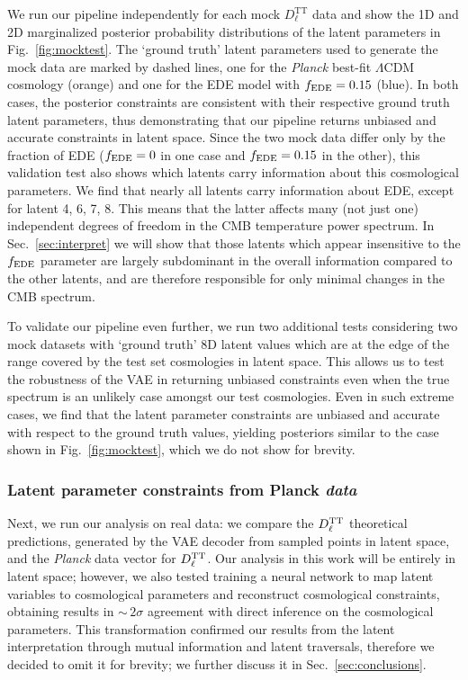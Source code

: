 \documentclass[aps, prd, reprint, superscriptaddress, nofootinbib, bibnotes]{revtex4-2}
\newcommand{\Planck}{\textit{Planck}}
\begin{document}
We run our pipeline independently for each mock $D_{\ell}^{\mathrm{TT}}$ data and show the 1D and 2D marginalized posterior probability distributions of the latent parameters in Fig.~\ref{fig:mocktest}. The `ground truth' latent parameters used to generate the mock data are marked by dashed lines, one for the \Planck{} best-fit $\Lambda$CDM cosmology (orange) and one for the EDE model with $f_{\rm EDE}=0.15$ (blue). In both cases, the posterior constraints are consistent with their respective ground truth latent parameters, thus demonstrating that our pipeline returns unbiased and accurate constraints in latent space. Since the two mock data differ only by the fraction of EDE ($f_{\rm EDE}=0$ in one case and $f_{\rm EDE}=0.15$ in the other), this validation test also shows which latents carry information about this cosmological parameters. We find that nearly all latents carry information about EDE, except for latent 4, 6, 7, 8. This means that the latter affects many (not just one) independent degrees of freedom in the CMB temperature power spectrum. In Sec.~\ref{sec:interpret} we will show that those latents which appear insensitive to the $f_{\rm EDE}$ parameter are largely subdominant in the overall information compared to the other latents, and are therefore responsible for only minimal changes in the CMB spectrum.

To validate our pipeline even further, we run two additional tests considering two mock datasets with `ground truth' 8D latent values which are at the edge of the range covered by the test set cosmologies in latent space. This allows us to test the robustness of the VAE in returning unbiased constraints even when the true spectrum is an unlikely case amongst our test cosmologies. Even in such extreme cases, we find that the latent parameter constraints are unbiased and accurate with respect to the ground truth values, yielding posteriors similar to the case shown in Fig.~\ref{fig:mocktest}, which we do not show for brevity.




\subsubsection{Latent parameter constraints from \rm{Planck} \it{data}}
\label{sec:planck_constraints}
Next, we run our analysis on real data: we compare the $D_{\ell}^{\rm TT}$ theoretical predictions, generated by the VAE decoder from sampled points in latent space, and the \Planck{} data vector for $D_{\ell}^{\rm TT}$. Our analysis in this work will be entirely in latent space; however, we also tested training a neural network to map latent variables to cosmological parameters and reconstruct cosmological constraints, obtaining results in $\sim\,2\sigma$ agreement with direct inference on the cosmological parameters. This transformation confirmed our results from the latent interpretation through mutual information and latent traversals, therefore we decided to omit it for brevity; we further discuss it in Sec.~\ref{sec:conclusions}.
\end{document}
